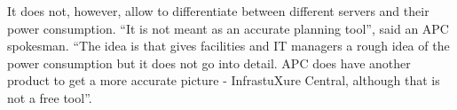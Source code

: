         It does not, however, allow to differentiate between different servers and their power consumption. ``It is not meant as an accurate planning tool'', said an APC spokesman. ``The idea is that gives facilities and IT managers a rough idea of the power consumption but it does not go into detail. APC does have another product to get a more accurate picture - InfrastuXure Central, although that is not a free tool''.
        
        

